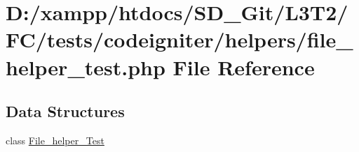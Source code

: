 \hypertarget{tests_2codeigniter_2helpers_2file__helper__test_8php}{}\section{D\+:/xampp/htdocs/\+S\+D\+\_\+\+Git/\+L3\+T2/\+F\+C/tests/codeigniter/helpers/file\+\_\+helper\+\_\+test.php File Reference}
\label{tests_2codeigniter_2helpers_2file__helper__test_8php}
\subsection*{Data Structures}
\begin{DoxyCompactItemize}
\item 
class \hyperlink{class_file__helper___test}{File\+\_\+helper\+\_\+\+Test}
\end{DoxyCompactItemize}
